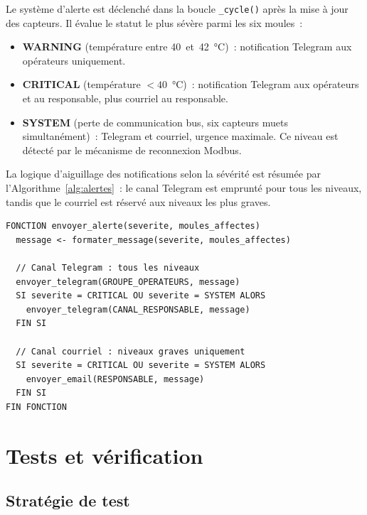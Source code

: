 Le système d'alerte est déclenché dans la boucle \texttt{\_cycle()} après la mise à jour des capteurs. Il évalue le statut le plus sévère parmi les six moules~:

\begin{itemize}
  \item \textbf{WARNING} (température entre 40~et~42~\si{\celsius})~: notification Telegram aux opérateurs uniquement.
  \item \textbf{CRITICAL} (température \(<40\)~\si{\celsius})~: notification Telegram aux opérateurs et au responsable, plus courriel au responsable.
  \item \textbf{SYSTEM} (perte de communication bus, six capteurs muets simultanément)~: Telegram et courriel, urgence maximale. Ce niveau est détecté par le mécanisme de reconnexion Modbus.
\end{itemize}

La logique d'aiguillage des notifications selon la sévérité est résumée par l'Algorithme~\ref{alg:alertes}~: le canal Telegram est emprunté pour tous les niveaux, tandis que le courriel est réservé aux niveaux les plus graves.

\begin{algorithm}[htbp]
\caption{Envoi des notifications selon la sévérité}
\label{alg:alertes}
\begin{minipage}{0.95\textwidth}
\begin{verbatim}
FONCTION envoyer_alerte(severite, moules_affectes)
  message <- formater_message(severite, moules_affectes)

  // Canal Telegram : tous les niveaux
  envoyer_telegram(GROUPE_OPERATEURS, message)
  SI severite = CRITICAL OU severite = SYSTEM ALORS
    envoyer_telegram(CANAL_RESPONSABLE, message)
  FIN SI

  // Canal courriel : niveaux graves uniquement
  SI severite = CRITICAL OU severite = SYSTEM ALORS
    envoyer_email(RESPONSABLE, message)
  FIN SI
FIN FONCTION
\end{verbatim}
\end{minipage}
\end{algorithm}

\section{Tests et vérification}

\subsection{Stratégie de test}

